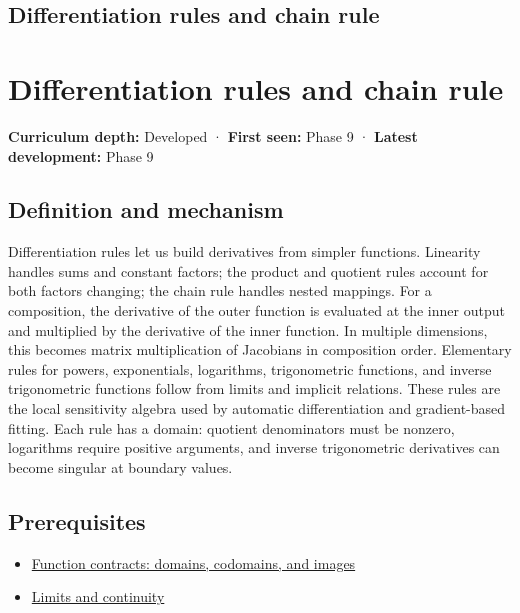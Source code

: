 \hypertarget{appendix-d9f70bdfbc92}{}
\section*{Differentiation rules and chain rule}
\chapter{Differentiation rules and chain rule}\label{appendix-d9f70bdfbc92-differentiation-rules-and-chain-rule}

\textbf{Curriculum depth:} Developed · \textbf{First seen:} Phase 9 · \textbf{Latest development:} Phase 9

\section{Definition and mechanism}\label{appendix-d9f70bdfbc92-definition-and-mechanism}

Differentiation rules let us build derivatives from simpler functions. Linearity handles sums and constant factors; the product and quotient rules account for both factors changing; the chain rule handles nested mappings. For a composition, the derivative of the outer function is evaluated at the inner output and multiplied by the derivative of the inner function. In multiple dimensions, this becomes matrix multiplication of Jacobians in composition order. Elementary rules for powers, exponentials, logarithms, trigonometric functions, and inverse trigonometric functions follow from limits and implicit relations. These rules are the local sensitivity algebra used by automatic differentiation and gradient-based fitting. Each rule has a domain: quotient denominators must be nonzero, logarithms require positive arguments, and inverse trigonometric derivatives can become singular at boundary values.

\section{Prerequisites}\label{appendix-d9f70bdfbc92-prerequisites}

\begin{itemize}
\tightlist
\item
  \hyperref[appendix-a59658325cd6]{Function contracts: domains, codomains, and images}
\item
  \hyperref[appendix-fecc1847f5a3]{Limits and continuity}
\end{itemize}


